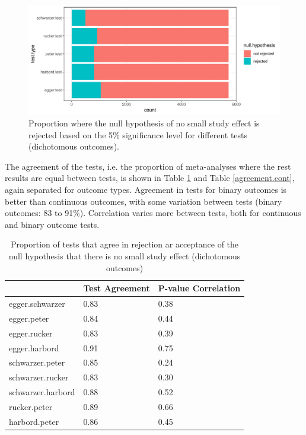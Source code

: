 \documentclass[11pt,a4paper,twoside]{book}\usepackage[]{graphicx}\usepackage[]{color}
\newenvironment{knitrout}{}{} %
\begin{document}
\begin{figure}
\begin{knitrout}
\color{fgcolor}

{\centering \includegraphics[width=\textwidth-3cm]{figure/ch02_figunnamed-chunk-20-1} 

}



\end{knitrout}
\caption{Proportion where the null hypothesis of no small study effect is rejected based on the 5\% significance level for different tests (dichotomous outcomes).}
\label{bias.results.bin}
\end{figure}


The agreement of the tests, i.e. the proportion of meta-analyses where the rest results are equal between tests, is shown in Table \ref{agreement.bin} and Table \ref{agreement.cont}, again separated for outcome types. Agreement in tests for binary outcomes is better than continuous outcomes, with some variation between tests (binary outcomes: 83 to 91\%). Correlation varies more between tests, both for continuous and binary outcome tests.

\begin{table}[ht]
\centering
\begingroup\footnotesize
\begin{tabular}{lll}
  \hline
 & Test Agreement & P-value Correlation \\ 
  \hline
egger.schwarzer & 0.83 & 0.38 \\ 
  egger.peter & 0.84 & 0.44 \\ 
  egger.rucker & 0.83 & 0.39 \\ 
  egger.harbord & 0.91 & 0.75 \\ 
  schwarzer.peter & 0.85 & 0.24 \\ 
  schwarzer.rucker & 0.83 & 0.30 \\ 
  schwarzer.harbord & 0.88 & 0.52 \\ 
  rucker.peter & 0.89 & 0.66 \\ 
  harbord.peter & 0.86 & 0.45 \\ 
   \hline
\end{tabular}
\endgroup
\caption{Proportion of tests that agree in rejection ar acceptance of the null hypothesis that there is no small study effect (dichotomous outcomes)} 
\label{agreement.bin}
\end{table}
\end{document}
